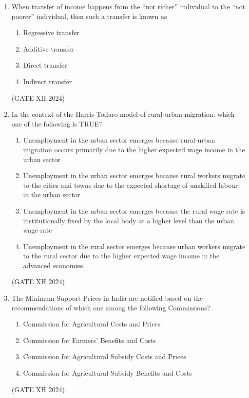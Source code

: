 \documentclass{article}
\begin{document}
\begin{enumerate}
    \item When transfer of income happens from the “not richer” individual to the “not poorer” individual, then such a transfer is known as
    
    \begin{multicols}{4}
        \begin{enumerate}
            \item Regressive transfer
            \item Additive transfer
            \item Direct transfer
            \item Indirect transfer
        \end{enumerate}
    \end{multicols} \hfill (GATE XH 2024)

    \item In the context of the Harris-Todaro model of rural-urban migration, which one of the following is TRUE?

    \begin{enumerate}
        \item Unemployment in the urban sector emerges because rural-urban migration occurs primarily due to the higher expected wage income in the urban sector
        \item Unemployment in the urban sector emerges because rural workers migrate to the cities and towns due to the expected shortage of unskilled labour in the urban sector
        \item Unemployment in the urban sector emerges because the rural wage rate is institutionally fixed by the local body at a higher level than the urban wage rate
        \item Unemployment in the rural sector emerges because urban workers migrate to the rural sector due to the higher expected wage income in the advanced economies.
    \end{enumerate} \hfill (GATE XH 2024)

    \item The Minimum Support Prices in India are notified based on the recommendations of which one among the following Commissions?
    
    \begin{enumerate}
        \item Commission for Agricultural Costs and Prices
        \item Commission for Farmers’ Benefits and Costs
        \item Commission for Agricultural Subsidy Costs and Prices
        \item Commission for Agricultural Subsidy Benefits and Costs
    \end{enumerate} \hfill (GATE XH 2024)


\end{enumerate}
\end{document}
